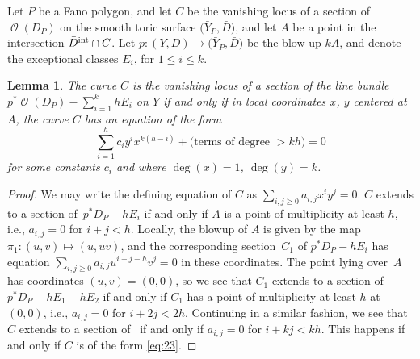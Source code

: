 \documentclass[pdftex]{sigma}
\numberwithin{equation}{section}
\newtheorem{Lemma}[Theorem]{Lemma}
\DeclareMathOperator{\cO}{\mathcal{O}}
\begin{document}
 Let $P$ be a Fano polygon, and let $C$ be the vanishing locus of a section of $\cO(D_P)$ on the smooth toric surface $\bigl(\bar{Y}_P, \bar{D}\bigr)$, and let $A$ be a point in the intersection $\bar{D}^{\rm int} \cap C$. Let $p \colon (Y, D) \rightarrow \bigl(\bar{Y}_P, \bar{D}\bigr)$ be the blow up $kA$, and denote the exceptional classes $E_i$, for $1 \leq i \leq k$.
\begin{Lemma}\label{lem:mutabilitygeometric}
	The curve $C$ is the vanishing locus of a section of the line bundle
$
	p^*\cO(D_P)-\sum_{i=1}^k h E_i
$
	 on $Y$ if and only if in local coordinates $x$, $y$ centered at $A$, the curve $C$ has an equation of the form
	\begin{equation}\label{eq:23}
		\sum_{i=1}^hc_i y^ix^{k(h-i)}+\text{$($terms of degree $>kh)$}=0
	\end{equation}
for some constants $c_i$ and where $\deg(x)=1$, $\deg(y)=k$.
\end{Lemma}
\begin{proof}
	We may write the defining equation of $C$ as $\sum_{i,j \geq 0} a_{i,j} x^i y^j=0$. $C$ extends to a section of~${p^*D_P-hE_i}$ if and only if $A$ is a point of multiplicity at least $h$, i.e., $a_{i,j}=0$ for $i+j<h$.
	Locally, the blowup of $A$ is given by the map $\pi_1 \colon (u,v) \mapsto (u, uv)$, and the corresponding section~$C_1$ of $p^*D_P-hE_i$ has equation
$\sum_{i,j \geq 0} a_{i,j} u^{i+j-h}v^j=0$
	 in these coordinates. The point lying over~$A$ has coordinates $(u,v)=(0,0)$, so we see that $C_1$ extends to a section of $p^*D_P-hE_1-hE_2$ if and only if $C_1$ has a point of multiplicity at least $h$ at $(0,0)$, i.e., $a_{i, j}=0$ for $i+2j<2h$.
	Continuing in a similar fashion, we see that $C$ extends to a section of~ if and only if $a_{i,j}=0$ for $i+kj<kh$.
	This happens if and only if $C$ is of the form \eqref{eq:23}.
\end{proof}
\end{document}
